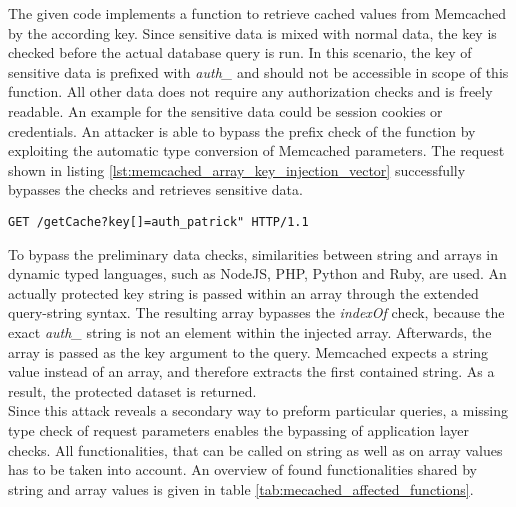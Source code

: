 The given code implements a function to retrieve cached values from Memcached by the according key. Since sensitive data is mixed with normal data, the key is checked before the actual database query is run. In this scenario, the key of sensitive data is prefixed with \emph{auth\_} and should not be accessible in scope of this function. All other data does not require any authorization checks and is freely readable. An example for the sensitive data could be session cookies or credentials. An attacker is able to bypass the prefix check of the function by exploiting the automatic type conversion of Memcached parameters. The request shown in listing \ref{lst:memcached_array_key_injection_vector} successfully bypasses the checks and retrieves sensitive data. \\

\begin{lstlisting}[caption={Attack vectors against Memcached for array key injection via the query-string parameter}, label={lst:memcached_array_key_injection_vector}]
GET /getCache?key[]=auth_patrick" HTTP/1.1
\end{lstlisting}

To bypass the preliminary data checks, similarities between string and arrays in dynamic typed languages, such as NodeJS, PHP, Python and Ruby, are used. An actually protected key string is passed within an array through the extended query-string syntax. The resulting array bypasses the \emph{indexOf} check, because the exact \emph{auth\_} string is not an element within the injected array. Afterwards, the array is passed as the key argument to the query. Memcached expects a string value instead of an array, and therefore extracts the first contained string. As a result, the protected dataset is returned.\\

Since this attack reveals a secondary way to preform particular queries, a missing type check of request parameters enables the bypassing of application layer checks. All functionalities, that can be called on string as well as on array values has to be taken into account. An overview of found functionalities shared by string and array values is given in table \ref{tab:mecached_affected_functions}.

